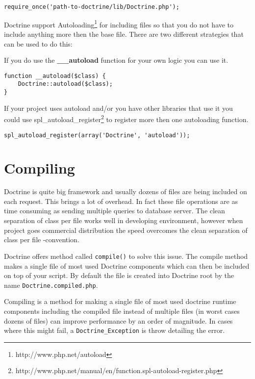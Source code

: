 \documentclass[11pt,a4paper]{report}
\begin{document}
\begin{verbatim}
require_once('path-to-doctrine/lib/Doctrine.php');
\end{verbatim}

Doctrine support Autoloading\footnote{http://www.php.net/autoload} for including files so that you do not have to include anything more then the base file. There are two different strategies that can be used to do this:

If you do use the \textbf{\_\_autoload} function for your own logic you can use it.

\begin{verbatim}
function __autoload($class) {
    Doctrine::autoload($class);
}
\end{verbatim}

If your project uses autoload and/or you have other libraries that use it you could use spl\_autoload\_register\footnote{http://www.php.net/manual/en/function.spl-autoload-register.php} to register more then one autoloading function.

\begin{verbatim}
spl_autoload_register(array('Doctrine', 'autoload'));
\end{verbatim}

\section{Compiling}
Doctrine is quite big framework and usually dozens of files are being included on each request. This brings a lot of overhead. In fact these file operations are as time consuming as sending multiple queries to database server. The clean separation of class per file works well in developing environment, however when project goes commercial distribution the speed overcomes the clean separation of class per file -convention.

Doctrine offers method called \texttt{compile()} to solve this issue. The compile method makes a single file of most used Doctrine components which can then be included on top of your script. By default the file is created into Doctrine root by the name \texttt{Doctrine.compiled.php}.

Compiling is a method for making a single file of most used doctrine runtime components including the compiled file instead of multiple files (in worst cases dozens of files) can improve performance by an order of magnitude. In cases where this might fail, a \texttt{Doctrine\_Exception} is throw detailing the error.
\end{document}
